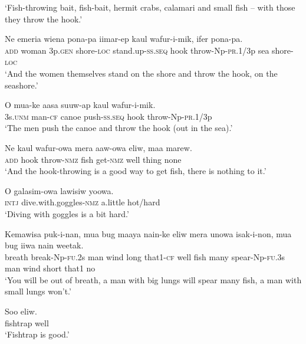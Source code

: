 \glt ‘Fish-throwing bait, fish-bait, hermit crabs, calamari and small fish – with those they throw the hook.’ \\
\z


\ea\label{ex:a:x52}
\gll  Ne  emeria  wiena  pona-pa  iimar-ep       kaul  wafur-i-mik,  ifer  pona-pa. \\
\textsc{add}  woman  3p.\textsc{gen}  shore-\textsc{loc}  stand.up-\textsc{ss.seq}   hook  throw-Np-\textsc{pr}.1/3p  sea  shore-\textsc{loc} \\


\glt ‘And the women themselves stand on the shore and throw the hook, on the seashore.’ \\
\z


\ea\label{ex:a:x53}
\gll  O  mua-ke  aasa  suuw-ap  kaul  wafur-i-mik. \\
3s.\textsc{unm}  man-\textsc{cf}  canoe  push-\textsc{ss.seq}  hook  throw-Np-\textsc{pr}.1/3p \\
\glt ‘The men push the canoe and throw the hook (out in the sea).’ \\
\z


\ea\label{ex:a:x54}
\gll  Ne  kaul  wafur-owa  mera  aaw-owa  eliw,  maa  marew. \\
\textsc{add}  hook  throw-\textsc{nmz}  fish  get-\textsc{nmz}  well  thing  none \\
\glt ‘And the hook-throwing is a good way to get fish, there is nothing to it.’ \\
\z


\ea\label{ex:a:x55}
\gll  O  galasim-owa  lawisiw  yoowa. \\
\textsc{intj}  dive.with.goggles-\textsc{nmz}  a.little  hot/hard \\
\glt ‘Diving with goggles is a bit hard.’ \\
\z


\ea\label{ex:a:x56}
\gll  Kemawisa  puk-i-nan,  mua  bug  maaya  nain-ke  eliw  mera  unowa  isak-i-non,  mua  bug  iiwa  nain  weetak. \\
breath  break-Np-\textsc{fu}.2s  man  wind  long  that1-\textsc{cf}  well     fish  many  spear-Np-\textsc{fu}.3s  man  wind  short  that1  no \\


\glt ‘You will be out of breath, a man with big lungs will spear many fish, a man with small lungs won’t.’ \\
\z


\ea\label{ex:a:x57}
\gll  Soo  eliw. \\
fishtrap  well \\
\glt ‘Fishtrap is good.’ \\
\z


